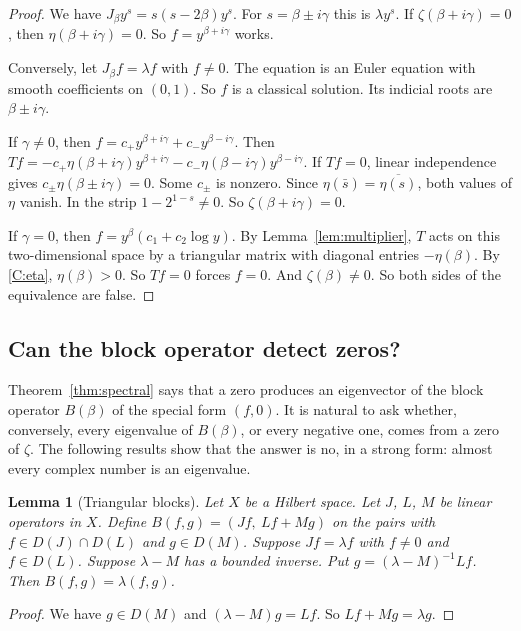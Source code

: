 \documentclass[12pt,letterpaper]{article}
\newtheorem{lemma}[theorem]{Lemma}
\theoremstyle{definition}
\theoremstyle{remark}
\numberwithin{equation}{section}
\begin{document}
\begin{proof}
We have $J_\beta y^s=s(s-2\beta)y^s$. For $s=\beta\pm i\gamma$ this is
$\lambda y^s$. If $\zeta(\beta+i\gamma)=0$, then $\eta(\beta+i\gamma)=0$.
So $f=y^{\beta+i\gamma}$ works.

Conversely, let $J_\beta f=\lambda f$ with $f\ne0$. The equation is an
Euler equation with smooth coefficients on $(0,1)$. So $f$ is a classical
solution. Its indicial roots are $\beta\pm i\gamma$.

If $\gamma\ne0$, then $f=c_+y^{\beta+i\gamma}+c_-y^{\beta-i\gamma}$. Then
$Tf=-c_+\eta(\beta+i\gamma)y^{\beta+i\gamma}-c_-\eta(\beta-i\gamma)
y^{\beta-i\gamma}$. If $Tf=0$, linear independence gives
$c_\pm\eta(\beta\pm i\gamma)=0$. Some $c_\pm$ is nonzero. Since
$\eta(\bar s)=\overline{\eta(s)}$, both values of $\eta$ vanish. In the
strip $1-2^{1-s}\ne0$. So $\zeta(\beta+i\gamma)=0$.

If $\gamma=0$, then $f=y^\beta(c_1+c_2\log y)$. By
Lemma~\ref{lem:multiplier}, $T$ acts on this two-dimensional space by a
triangular matrix with diagonal entries $-\eta(\beta)$. By \ref{C:eta},
$\eta(\beta)>0$. So $Tf=0$ forces $f=0$. And $\zeta(\beta)\ne0$. So both
sides of the equivalence are false.
\end{proof}

\subsection{Can the block operator detect zeros?}

Theorem~\ref{thm:spectral} says that a zero produces an eigenvector of
the block operator $B(\beta)$ of the special form $(f,0)$.  It is natural
to ask whether, conversely, every eigenvalue of $B(\beta)$, or every
negative one, comes from a zero of $\zeta$.  The following results show
that the answer is no, in a strong form: almost every complex number is
an eigenvalue.

\begin{lemma}[Triangular blocks]\label{lem:triangular}
Let $X$ be a Hilbert space. Let $J$, $L$, $M$ be linear operators in $X$.
Define $B(f,g)=(Jf,\ Lf+Mg)$ on the pairs with $f\in D(J)\cap D(L)$ and
$g\in D(M)$. Suppose $Jf=\lambda f$ with $f\ne0$ and $f\in D(L)$. Suppose
$\lambda-M$ has a bounded inverse. Put $g=(\lambda-M)^{-1}Lf$. Then
$B(f,g)=\lambda(f,g)$.
\end{lemma}

\begin{proof}
We have $g\in D(M)$ and $(\lambda-M)g=Lf$. So $Lf+Mg=\lambda g$.
\end{proof}
\end{document}
